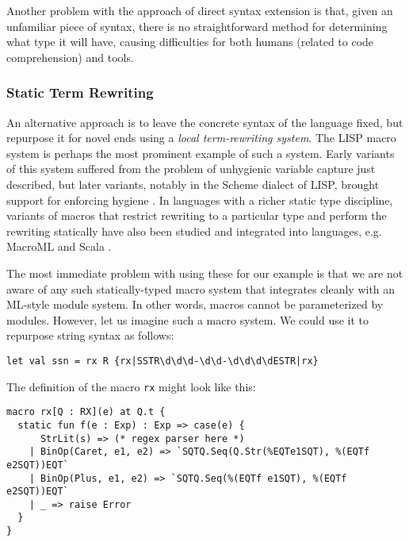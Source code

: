 Another problem with the approach of direct syntax extension is that, given an unfamiliar piece of syntax, there is no straightforward method for determining what type it will have, causing difficulties for both humans (related to code comprehension) and tools. 

\subsubsection{Static Term Rewriting}\label{sec:term-rewriting}
An alternative approach is to leave the concrete syntax of the language fixed, but repurpose it for novel ends using a \emph{local term-rewriting system}. The LISP macro system \cite{Hart63a} is perhaps the most prominent example of such a system. Early variants of this system suffered from the problem of unhygienic variable capture just described, but  later variants, notably in the Scheme dialect of LISP, brought support for enforcing hygiene \cite{Kohlbecker86a}. In languages with a richer static type discipline, variants of macros that restrict rewriting to a particular type and perform the rewriting statically have also been studied \cite{Herman10:Theory,ganz2001macros} and integrated into languages, e.g. MacroML \cite{ganz2001macros} and Scala \cite{ScalaMacros2013}. 

The most immediate problem with using these for our example is that we are not aware of any such statically-typed macro system that integrates cleanly with an ML-style module system. In other words, macros cannot be parameterized by modules. However, let us imagine such a macro system. We could use it to repurpose string syntax  as follows:
\begin{lstlisting}[numbers=none]
let val ssn = rx R {rx|SSTR\d\d\d-\d\d-\d\d\d\dESTR|rx}
\end{lstlisting}

The definition of the macro \lstinline{rx} might look like this:
\begin{lstlisting}
macro rx[Q : RX](e) at Q.t {
  static fun f(e : Exp) : Exp => case(e) {
      StrLit(s) => (* regex parser here *)
    | BinOp(Caret, e1, e2) => `SQTQ.Seq(Q.Str(%EQTe1SQT), %(EQTf e2SQT))EQT`
    | BinOp(Plus, e1, e2) => `SQTQ.Seq(%(EQTf e1SQT), %(EQTf e2SQT))EQT`
    | _ => raise Error
  }
}
\end{lstlisting}

